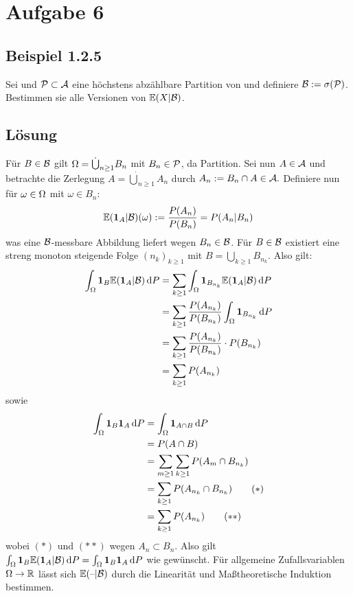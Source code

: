 \documentclass[12pt]{scrartcl}
\date{\today}
\begin{document}
\section*{Aufgabe 6}
\subsection*{Beispiel 1.2.5}
\einruecken

Sei \WraumAnn{} und $\mathcal{P}\subset\mathcal{A}$ eine höchstens abzählbare Partition von \Om{} und definiere $\mathcal{B}:=\sigma(\mathcal{P})$.
Bestimmen sie alle Versionen von $\mathbb{E}(X|\mathcal{B})$. %
	
\ausruecken

\subsection*{Lösung}
\einruecken

Für $B\in\mathcal{B}$ gilt $\Omega=\dot\bigcup_{n\ge1}B_n$ mit $B_n\in\mathcal{P}$, da \scriptP{} Partition.
Sei nun $A\in\mathcal{A}$ und betrachte die Zerlegung $A=\dot\bigcup_{n\ge1}A_n$ durch $A_n:=B_n\cap A\in\mathcal{A}.$
Definiere nun für $\omega\in\Omega$ mit $\omega\in B_n$:
$$\mathbb{E}(\textbf{1}_A|\mathcal{B})(\omega):=\frac{P(A_n)}{P(B_n)}=P(A_n|B_n)$$
was eine $\mathcal{B}$-messbare Abbildung liefert wegen $B_n\in\mathcal{B}$.
Für $B\in\mathcal{B}$ existiert eine streng monoton steigende Folge $(n_k)_{k\ge 1}$ mit $B=\bigcup_{k\ge 1}B_{n_k}$. Also gilt:
\begin{align*}
\int_{\Omega}\textbf{1}_B\mathbb{E}(\textbf{1}_A|\mathcal{B}) \mathop{}\!\mathrm{d} P
&= \sum_{k\ge 1}\int_{\Omega}\textbf{1}_{B_{n_k}}\mathbb{E}(\textbf{1}_A|\mathcal{B}) \mathop{}\!\mathrm{d} P \\
&= \sum_{k\ge 1}\frac{P(A_{n_k})}{P(B_{n_k})}\int_{\Omega}\textbf{1}_{B_{n_k}} \mathop{}\!\mathrm{d} P \\
&= \sum_{k\ge 1}\frac{P(A_{n_k})}{P(B_{n_k})}\cdot P(B_{n_k}) \\
&= \sum_{k\ge 1}P(A_{n_k})
\end{align*}
sowie
\begin{align*}
\int_{\Omega}\textbf{1}_B\textbf{1}_A \mathop{}\!\mathrm{d} P 
&= \int_{\Omega}\textbf{1}_{A\cap B} \mathop{}\!\mathrm{d} P \\
&= P(A\cap B) \\
&= \sum_{m\ge 1}\sum_{k\ge 1}P(A_m\cap B_{n_k}) \\
&= \sum_{k\ge 1}P(A_{n_k}\cap B_{n_k}) \tag{$\ast$} \\
&= \sum_{k\ge 1}P(A_{n_k}) \tag{$\ast\ast$}
\end{align*}
wobei $(\ast)$ und $(\ast\ast)$ wegen $A_n\subset B_n$.
Also gilt $\int_{\Omega}\textbf{1}_B\mathbb{E}(\textbf{1}_A|\mathcal{B}) \mathop{}\!\mathrm{d} P=\int_{\Omega}\textbf{1}_B\textbf{1}_A \mathop{}\!\mathrm{d} P$
wie gewünscht.
Für allgemeine Zufallsvariablen $\Omega\rightarrow\mathbb{R}$ lässt sich $\mathbb{E}(\text{--}|\mathcal{B})$ durch die Linearität und Maßtheoretische Induktion bestimmen.
\end{document}
